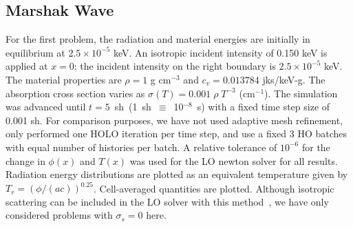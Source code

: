 \documentclass[12pt]{article}
\begin{document}
\begin{center}
\subsection{Marshak Wave}
\label{sec:marsh}

For the first problem, the radiation and material energies are initially in
equilibrium at $2.5\times 10^{-5}$ keV.   An isotropic incident intensity of 0.150 keV is applied
at $x=0$; the incident intensity on the right boundary is $2.5\times10^{-5}$ keV.
The material properties are $\rho = 1$ g cm$^{-3}$ and $c_v = 0.013784$ jks/keV-g. The
absorption cross section varies as $\sigma(T) = 0.001\;\rho\; T^{-3}$ (cm$^{-1}$).
The simulation was advanced until $t=5$~sh~(1~sh~$\equiv$~10$^{-8}$~s) with a fixed time step size of 0.001 sh. For comparison purposes, we
have not used adaptive mesh
refinement, only performed one HOLO iteration per time
step, and use a fixed 3 HO batches with equal number of histories per batch. A
relative tolerance of $10^{-6}$ for the change in $\phi(x)$ and $T(x)$ was used for
the LO newton solver for all results. Radiation energy
distributions are plotted as an equivalent temperature given by
$T_r=(\phi/(ac))^{0.25}$.  Cell-averaged quantities are plotted.
Although isotropic scattering can be included in the LO solver with this method~\cite{ans_2014}, we have only
considered problems with $\sigma_s = 0$ here.  


\end{center}
\end{document}
